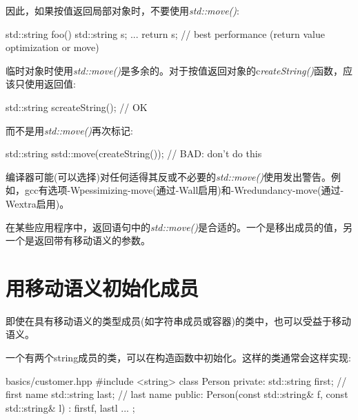 因此，如果按值返回局部对象时，不要使用\textit{std::move()}:\par

\begin{codebox}[cpp]
std::string foo()
{
  std::string s;
  ...
  return s; // best performance (return value optimization or move)
}
\end{codebox}

临时对象时使用\textit{std::move()}是多余的。对于按值返回对象的c\textit{reateString(\allowbreak{})\allowbreak{}}函数，应该只使用返回值:\par

\begin{codebox}[cpp]
std::string s{createString()}; // OK
\end{codebox}

而不是用\textit{std::move()}再次标记:\par

\begin{codebox}[cpp]
std::string s{std::move(createString())}; // BAD: don’t do this
\end{codebox}

编译器可能(可以选择)对任何适得其反或不必要的\textit{std::move()}使用发出警告。例如，gcc有选项-Wpessimizing-move(通过-Wall启用)和-Wredundancy-move(通过-Wextra启用)。\par

在某些应用程序中，返回语句中的\textit{std::move()}是合适的。一个是移出成员的值，另一个是返回带有移动语义的参数。\par


\section{用移动语义初始化成员}

即使在具有移动语义的类型成员(如字符串成员或容器)的类中，也可以受益于移动语义。\par


一个有两个string成员的类，可以在构造函数中初始化。这样的类通常会这样实现:\par

\begin{codeboxt}[cpp]{basics/customer.hpp}
#include <string>
class Person {
private:
  std::string first; // first name
  std::string last; // last name
public:
  Person(const std::string& f, const std::string& l)
  : first{f}, last{l} {
  }
  ...
};
\end{codeboxt}

